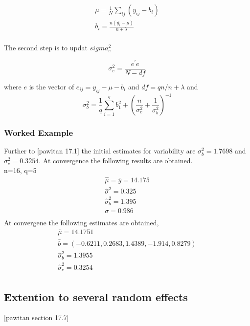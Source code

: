 \documentclass[12pt, a4paper]{report}
\theoremstyle{plain}
\theoremstyle{definition}
\theoremstyle{remark}
\begin{document}
	\begin{eqnarray*}
		\mu = \frac{1}{N} \sum_{ij} (y_{ij} - b_{i}) \\
		b_{i} = \frac{n(\bar{y_{i}}-\mu)}{n+ \lambda} \\
	\end{eqnarray*}
	
	
	The second step is to updat $sigma^2_{e}$
	
	\begin{equation}
	\sigma^2_{e} = \frac{e^{\prime}e}{N-df}
	\end{equation}
	
	where $e$ is the vector of $e_{ij} = y_{ij}-\mu-b_{i}$ and $df =
	qn / n+\lambda$ and
	\begin{equation}
	\sigma^{2}_{b} = \frac{1}{q} \sum_{i=1}^{q} b_{1}^2 +
	(\frac{n}{\sigma^2_{e}}+\frac{1}{\sigma^2_{b}})^{-1}
	\end{equation}
	
	\subsubsection{Worked Example}
	
	Further to [pawitan 17.1] the initial estimates for variability
	are $\sigma^{2}_{b} = 1.7698$ and $\sigma^{2}_{e} = 0.3254$. At
	convergence the following results are obtained.
	\\
	n=16, q=5
	\begin{eqnarray*}
		\hat{\mu} = \bar{y} = 14.175 \\
		\hat{\sigma}^2 = 0.325\\
		\hat{\sigma}^2_{b} = 1.395\\
		\sigma  = 0.986 \\
	\end{eqnarray*}
	At convergene the following estimates are obtained,
	\begin{eqnarray*}
		\hat{\mu} = 14.1751 \\
		\hat{b}= (-0.6211, 0.2683,1.4389,-1.914,0.8279)\\
		\hat{\sigma}^2_{b} = 1.3955\\
		\hat{\sigma}^2_{e} = 0.3254\\
	\end{eqnarray*}
	
	
	\subsection{Extention to several random effects}
	[pawitan section 17.7]
	
\end{document}
